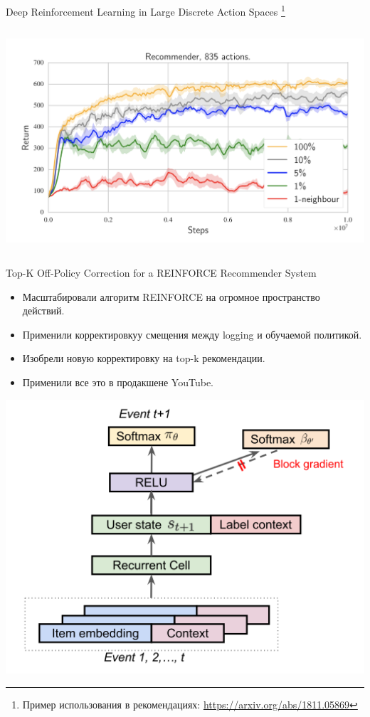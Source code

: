 \documentclass[11pt,aspectratio=169,handout]{beamer}
\begin{document}
\begin{frame}{Deep Reinforcement Learning in Large Discrete Action Spaces \cite{DDPG}\footnote{Пример использования в рекомендациях: \url{https://arxiv.org/abs/1811.05869}}}
\begin{columns}
\begin{column}{0.5\textwidth}
\begin{center}
\includegraphics[scale=0.25]{images/ddpg-result.png}
\end{center}
\end{column}
\end{columns}

\end{frame}

\begin{frame}{Top-K Off-Policy Correction for a REINFORCE Recommender System
 \cite{TOPK}}
 
\begin{itemize}
\item Масштабировали алгоритм REINFORCE на огромное пространство действий.
\item Применили корректировкуу смещения между logging и обучаемой политикой.
\item Изобрели новую корректировку на top-k рекомендации.
\item Применили все это в продакшене YouTube.
\end{itemize}

\begin{center}
\includegraphics[scale=0.25]{images/topk.png}
\end{center}

\end{frame}
\end{document}
